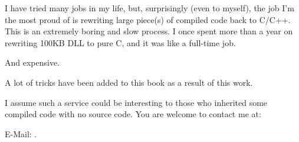 
\normalsize

\bigskip
\bigskip
\bigskip


I have tried many jobs in my life, but, surprisingly (even to myself),
the job I'm the most proud of is rewriting large piece(s) of compiled code back to C/C++.
This is an extremely boring and slow process. I once spent more than a year on rewriting 100KB DLL to pure C,
and it was like a full-time job.

And expensive.

A lot of tricks have been added to this book as a result of this work.

I assume such a service could be interesting to those who inherited some compiled code with no source code.
You are welcome to contact me at:

E-Mail: \GTT{\EMAIL}.

